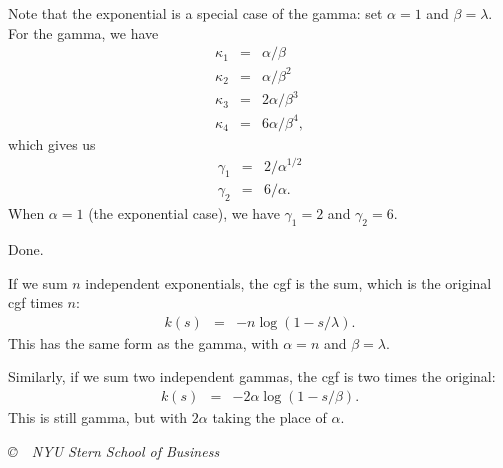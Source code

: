 \documentclass[11pt]{exam}
\begin{document}
\begin{questions}
\begin{solution}
\begin{parts}
\item Note that the exponential is a special case of the gamma:
set $\alpha = 1$ and $\beta = \lambda$.
For the gamma, we have
\begin{eqnarray*}
    \kappa_1 &=& \alpha /\beta \\
    \kappa_2 &=& \alpha /\beta^2 \\
    \kappa_3 &=& 2 \alpha /\beta^3 \\
    \kappa_4 &=& 6 \alpha /\beta^4 ,
\end{eqnarray*}
which gives us
\begin{eqnarray*}
    \gamma_1 &=& 2/\alpha^{1/2} \\
    \gamma_2 &=& 6/\alpha .
\end{eqnarray*}
When $\alpha = 1$ (the exponential case), we have $\gamma_1 = 2$
and $\gamma_2 = 6$.

\item Done.

\item If we sum $n$ independent exponentials, the cgf is the sum, which is the original
cgf times $n$:
\begin{eqnarray*}
    k(s)  &=& - n \log \left( 1 - s/\lambda \right)  .
\end{eqnarray*}
This has the same form as the gamma, with $\alpha = n$ and $\beta = \lambda$.

\item Similarly, if we sum two independent gammas, the cgf
is two times the original:
\begin{eqnarray*}
    k(s)  &=& - 2\alpha \log \left( 1 - s/\beta \right) .
\end{eqnarray*}
This is still gamma, but with $2\alpha$ taking the place of $\alpha$.
\end{parts}
\end{solution}


\end{questions}

\vfill \centerline{\it \copyright \ \number\year \ NYU Stern School of Business}
\end{document}
